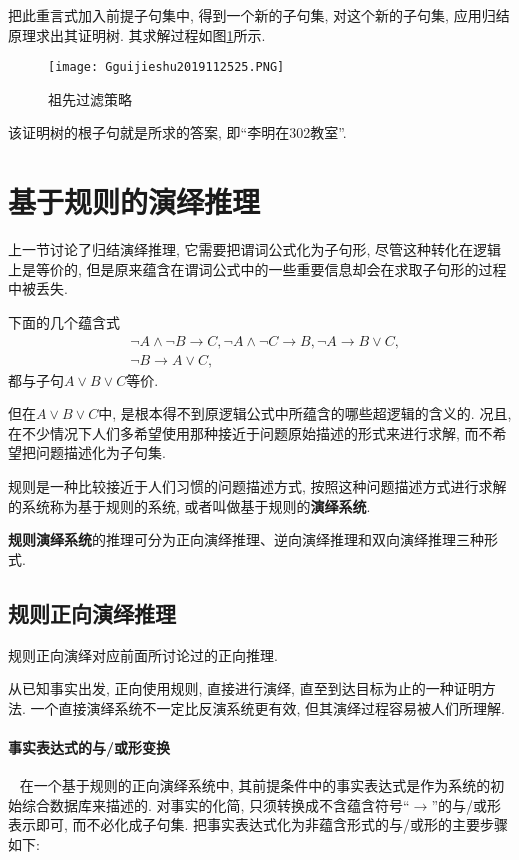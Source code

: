 把此重言式加入前提子句集中, 得到一个新的子句集, 对这个新的子句集, 应用归结原理求出其证明树. 其求解过程如图\ref{AI32fig20200425}所示.
\begin{figure}[H]
\centering
    \texttt{[image: Gguijieshu2019112525.PNG]}
    \caption{祖先过滤策略}
    \label{AI32fig20200425}
\end{figure}
该证明树的根子句就是所求的答案, 即“李明在302教室”.
\section{基于规则的演绎推理}
    上一节讨论了归结演绎推理, 它需要把谓词公式化为子句形, 尽管这种转化在逻辑上是等价的, 但是原来蕴含在谓词公式中的一些重要信息却会在求取子句形的过程中被丢失.
\begin{example}
下面的几个蕴含式
\begin{align}
  &\neg A\wedge \neg B\rightarrow C,  \neg A\wedge \neg C\rightarrow B,  \neg A\rightarrow B\vee C,\\
  &\neg B\rightarrow A\vee C,
\end{align}
都与子句$A\vee B\vee C$等价.
\end{example}

但在$A\vee B\vee C$中, 是根本得不到原逻辑公式中所蕴含的哪些超逻辑的含义的. 况且, 在不少情况下人们多希望使用那种接近于问题原始描述的形式来进行求解, 而不希望把问题描述化为子句集.

规则是一种比较接近于人们习惯的问题描述方式, 按照这种问题描述方式进行求解的系统称为基于规则的系统, 或者叫做基于规则的\textbf{演绎系统}.

\textbf{规则演绎系统}的推理可分为正向演绎推理、逆向演绎推理和双向演绎推理三种形式.
\subsection{规则正向演绎推理}
规则正向演绎对应前面所讨论过的正向推理.

从已知事实出发, 正向使用规则, 直接进行演绎, 直至到达目标为止的一种证明方法. 一个直接演绎系统不一定比反演系统更有效, 但其演绎过程容易被人们所理解.
\paragraph{事实表达式的与/或形变换}~{}
    在一个基于规则的正向演绎系统中, 其前提条件中的事实表达式是作为系统的初始综合数据库来描述的. 对事实的化简, 只须转换成不含蕴含符号“$\rightarrow$”的与/或形表示即可, 而不必化成子句集.
把事实表达式化为非蕴含形式的与/或形的主要步骤如下:

